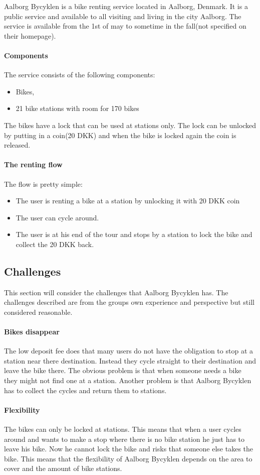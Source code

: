 Aalborg Bycyklen is a bike renting service located in Aalborg, Denmark.
It is a public service and available to all visiting and living in the city Aalborg.
The service is available from the 1st of may to sometime in the fall(not specified on their homepage).
\cite{aalborgbycyklenbagcyklen}

\paragraph{Components}
The service consists of the following components:
\begin{itemize}
\item Bikes, 
\item 21 bike stations with room for 170 bikes
\end{itemize}
The bikes have a lock that can be used at stations only.
The lock can be unlocked by putting in a coin(20 DKK) and when the bike is locked again the coin is released.

\paragraph{The renting flow}
The flow is pretty simple:
\begin{itemize}
\item The user is renting a bike at a station by unlocking it with 20 DKK coin
\item The user can cycle around.
\item The user is at his end of the tour and stops by a station to lock the bike and collect the 20 DKK back.
\end{itemize}

\subsection{Challenges}
This section will consider the challenges that Aalborg Bycyklen has.
The challenges described are from the groups own experience and perspective but still considered reasonable.

\paragraph{Bikes disappear}
The low deposit fee does that many users do not have the obligation to stop at a station near there destination.
Instead they cycle straight to their destination and leave the bike there.
The obvious problem is that when someone needs a bike they might not find one at a station.
Another problem is that Aalborg Bycyklen has to collect the cycles and return them to stations.

\paragraph{Flexibility}
The bikes can only be locked at stations.
This means that when a user cycles around and wants to make a stop where there is no bike station he just has to leave his bike.
Now he cannot lock the bike and risks that someone else takes the bike.
This means that the flexibility of Aalborg Bycyklen depends on the area to cover and the amount of bike stations.